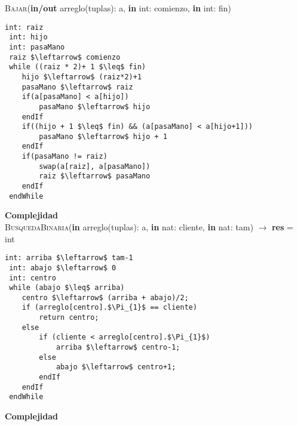 \textsc{Bajar}(\textbf{in/out} arreglo(tuplas): a, \textbf{in} int: comienzo, \textbf{in} int: fin)
\begin{lstlisting}[mathescape]
 int: raiz
 int: hijo
 int: pasaMano
 raiz $\leftarrow$ comienzo
 while ((raiz * 2)+ 1 $\leq$ fin)
 	hijo $\leftarrow$ (raiz*2)+1
 	pasaMano $\leftarrow$ raiz
 	if(a[pasaMano] < a[hijo])
 		pasaMano $\leftarrow$ hijo
 	endIf
 	if((hijo + 1 $\leq$ fin) && (a[pasaMano] < a[hijo+1]))
 		pasaMano $\leftarrow$ hijo + 1
 	endIf
 	if(pasaMano != raiz)
 		swap(a[raiz], a[pasaMano])
 		raiz $\leftarrow$ pasaMano
 	endIf
 endWhile
\end{lstlisting}
\textbf{Complejidad}\\


\textsc{BusquedaBinaria}(\textbf{in} arreglo(tuplas): a, \textbf{in} nat: cliente, \textbf{in} nat: tam) $\rightarrow$ \textbf{res} = int
\begin{lstlisting}[mathescape]
 int: arriba $\leftarrow$ tam-1
 int: abajo $\leftarrow$ 0
 int: centro
 while (abajo $\leq$ arriba)
 	centro $\leftarrow$ (arriba + abajo)/2;
    if (arreglo[centro].$\Pi_{1}$ == cliente)
 		return centro;
    else
 		if (cliente < arreglo[centro].$\Pi_{1}$)
   			arriba $\leftarrow$ centro-1;
 		else
   			abajo $\leftarrow$ centro+1;
   		endIf
   	endIf
 endWhile
\end{lstlisting}
\textbf{Complejidad}\\
